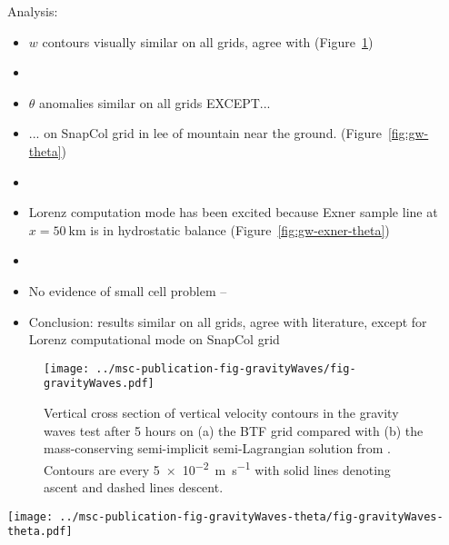 \documentclass[twocol]{ametsoc}
\begin{document}
Analysis:
\begin{itemize}
	\item $w$ contours visually similar on all grids, agree with \citet{melvin2010} (Figure~\ref{fig:gw-w})
	\item {}
	\item $\theta$ anomalies similar on all grids EXCEPT...
	\item ... on SnapCol grid in lee of mountain near the ground. (Figure~\ref{fig:gw-theta})
	\item {}
	\item Lorenz computation mode has been excited because Exner sample line at $x = \SI{50}{\kilo\meter}$ is in hydrostatic balance (Figure~\ref{fig:gw-exner-theta})
	\item {}
	\item No evidence of small cell problem -- 
	\item Conclusion: results similar on all grids, agree with literature, except for Lorenz computational mode on SnapCol grid
\end{itemize}

\begin{figure}
	\centering
	\texttt{[image: ../msc-publication-fig-gravityWaves/fig-gravityWaves.pdf]}
%
	\caption{Vertical cross section of vertical velocity contours in the gravity waves test after 5 hours on (a) the BTF grid compared with (b) the mass-conserving semi-implicit semi-Lagrangian solution from \citet{melvin2010}.  Contours are every \SI{5e-2}{\meter\per\second} with solid lines denoting ascent and dashed lines descent.}
	\label{fig:gw-w}
\end{figure}

\begin{figure*}
	\centering
	\texttt{[image: ../msc-publication-fig-gravityWaves-theta/fig-gravityWaves-theta.pdf]}
%
	\caption{Anomalies in potential temperature in the gravity waves test after 5 hours.  The central domain in the lowest \SI{12}{\kilo\meter} is shown on (a) the BTF grid, and (c) the cut cell grid.  The four lowest layers of each grid are shown for (b) BTF, and (d) cut cell grids, using a narrower potential temperature scale.}
	\label{fig:gw-theta}
\end{figure*}
\end{document}
